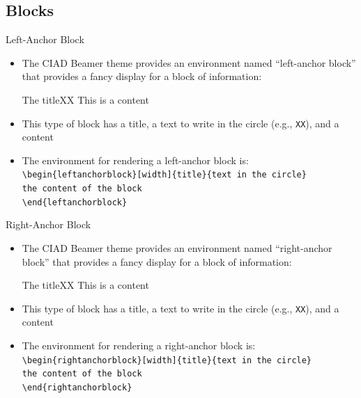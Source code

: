 \documentclass[english,sectioncirclenumberstyle]{ciadbeamer}
\begin{document}
\subsection{Blocks}
\subsectiontableofcontentslide

\begin{frame}{Left-Anchor Block}
	\begin{itemize}
		\item The CIAD Beamer theme provides an environment named ``left-anchor block'' that provides a fancy display for a block of information: \\[.25cm]
			\begin{leftanchorblock}{The title}{XX}
				This is a content
			\end{leftanchorblock}
		\vspace{.5cm}
		\item This type of block has a title, a text to write in the circle (e.g., \texttt{XX}), and a content
		\item The environment for rendering a left-anchor block is: \\[.25cm]
			\texttt{{\textbackslash}begin\{leftanchorblock\}[width]\{title\}\{text in the circle\}} \\
			\mbox{}\hspace{.2cm}\texttt{the content of the block} \\
			\texttt{{\textbackslash}end\{leftanchorblock\}}
	\end{itemize}
\end{frame}

\begin{frame}{Right-Anchor Block}
	\begin{itemize}
		\item The CIAD Beamer theme provides an environment named ``right-anchor block'' that provides a fancy display for a block of information: \\[.25cm]
		\begin{rightanchorblock}{The title}{XX}
			This is a content
		\end{rightanchorblock}
		\vspace{.5cm}
		\item This type of block has a title, a text to write in the circle (e.g., \texttt{XX}), and a content
		\item The environment for rendering a right-anchor block is: \\[.25cm]
		\texttt{{\textbackslash}begin\{rightanchorblock\}[width]\{title\}\{text in the circle\}} \\
		\mbox{}\hspace{.2cm}\texttt{the content of the block} \\
		\texttt{{\textbackslash}end\{rightanchorblock\}}
	\end{itemize}
\end{frame}
\end{document}
